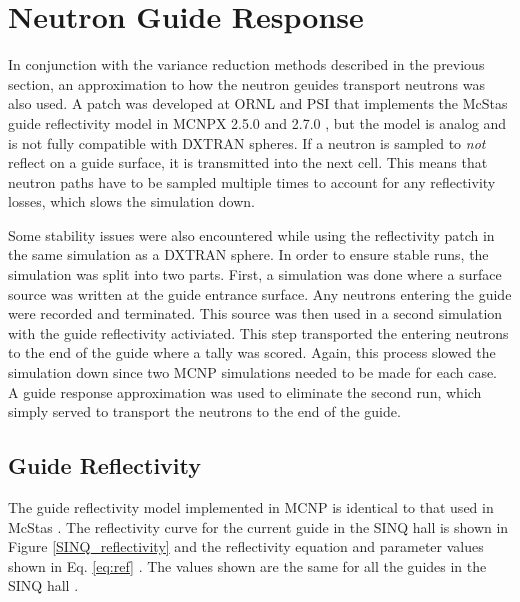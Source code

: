 \documentclass[a4paper]{jpconf}
\begin{document}
\section{Neutron Guide Response} 

In conjunction with the variance reduction methods described in the previous section, an approximation to how the neutron geuides transport neutrons was also used.  A patch was developed at ORNL and PSI that implements the McStas guide reflectivity model in MCNPX 2.5.0 and 2.7.0 \cite{mcnp_reflectivity, EK_reflectivity}, but the model is analog and is not fully compatible with DXTRAN spheres.  If a neutron is sampled to \emph{not} reflect on a guide surface, it is transmitted into the next cell.  This means that neutron paths have to be sampled multiple times to account for any reflectivity losses, which slows the simulation down.  

Some stability issues were also encountered while using the reflectivity patch in the same simulation as a DXTRAN sphere.  In order to ensure stable runs, the simulation was split into two parts.  First, a simulation was done where a surface source was written at the guide entrance surface.  Any neutrons entering the guide were recorded and terminated.  This source was then used in a second simulation with the guide reflectivity activiated.  This step transported the entering neutrons to the end of the guide where a tally was scored.  Again, this process slowed the simulation down since two MCNP simulations needed to be made for each case.  A guide response approximation was used to eliminate the second run, which simply served to transport the neutrons to the end of the guide.


\subsection{Guide Reflectivity}

The guide reflectivity model implemented in MCNP is identical to that used in McStas \cite{mcnp_reflectivity}.  The reflectivity curve for the current guide in the SINQ hall is shown in Figure \ref{SINQ_reflectivity} and the reflectivity equation and parameter values shown in Eq. \ref{eq:ref} \cite{mcstas}.  The values shown are the same for all the guides in the SINQ hall \cite{SINQ_guide_values}.
\end{document}

